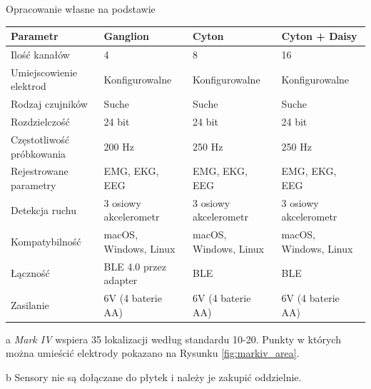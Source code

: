 \documentclass[skorowidz,skroty]{dyplomWEZUT}
\begin{document}
\begin{landscape}
    {Opracowanie własne na podstawie~\cite{markiv_shop,ganglion_shop,cyton_shop,cytondaisy_shop}}
    {
        \begin{threeparttable}
            \begin{tabular}{l|l|l|l}
                Parametr & Ganglion & Cyton & Cyton + Daisy \\\hline\hline
                Ilość kanałów & 4 & 8 & 16\\
                Umiejscowienie elektrod & Konfigurowalne\tnote{a} & Konfigurowalne\tnote{a} & Konfigurowalne\tnote{a}\\
                Rodzaj czujników & Suche & Suche & Suche\\
                Rozdzielczość & 24 bit & 24 bit & 24 bit\\
                Częstotliwość próbkowania & 200 Hz & 250 Hz & 250 Hz\\
                Rejestrowane parametry & EMG, EKG, EEG\tnote{b} & EMG, EKG, EEG\tnote{b}  & EMG, EKG, EEG\tnote{b}\\
                Detekcja ruchu & 3 osiowy akcelerometr & 3 osiowy akcelerometr & 3 osiowy akcelerometr\\
                Kompatybilność & macOS, Windows, Linux & macOS, Windows, Linux & macOS, Windows, Linux\\
                Łączność & BLE 4.0 przez adapter & BLE & BLE\\
                Zasilanie & 6V (4 baterie AA) & 6V (4 baterie AA) & 6V (4 baterie AA)\\
            \end{tabular}
            \begin{tablenotes}
                \item[a] \footnotesize \textit{Mark IV} wspiera 35 lokalizacji według standardu 10-20. Punkty w których można umieścić elektrody pokazano na Rysunku \vref{fig:markiv_area}.
                \item[b] \footnotesize Sensory nie są dołączane do płytek i należy je zakupić oddzielnie.
            \end{tablenotes}
        \end{threeparttable}
    }
\end{landscape}

\end{document}
